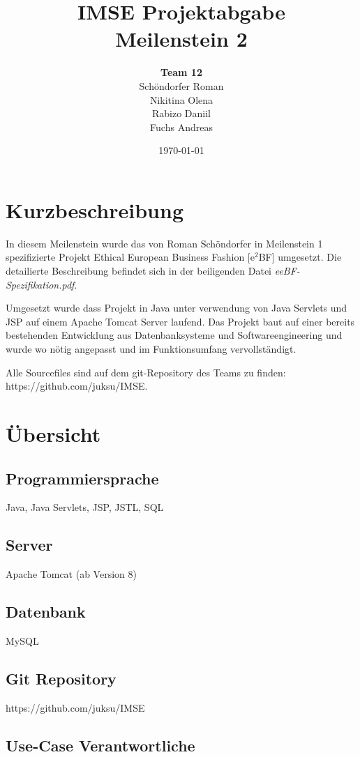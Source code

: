 \documentclass[a4paper]{article}
\title{\textbf{IMSE Projektabgabe}\\ Meilenstein 2}
\author{\textbf{Team 12} \\ Schöndorfer Roman \\ Nikitina Olena \\ Rabizo Daniil \\ Fuchs Andreas}
\date{\today}
\begin{document}
\maketitle


\section*{Kurzbeschreibung}
In diesem Meilenstein wurde das von Roman Schöndorfer in Meilenstein 1 spezifizierte Projekt Ethical European Business Fashion [e\(^2\)BF] umgesetzt. Die detailierte Beschreibung befindet sich in der beiligenden Datei \emph{eeBF-Spezifikation.pdf}.

Umgesetzt wurde dass Projekt in Java unter verwendung von Java Servlets und JSP auf einem Apache Tomcat Server laufend. Das Projekt baut auf einer bereits bestehenden Entwicklung aus Datenbanksysteme und Softwareengineering und wurde wo nötig angepasst und im Funktionsumfang vervollständigt.

Alle Sourcefiles sind auf dem git-Repository des Teams zu finden: \\ https://github.com/juksu/IMSE.

\section*{Übersicht}
\subsection*{Programmiersprache} Java, Java Servlets, JSP, JSTL, SQL

\subsection*{Server} Apache Tomcat (ab Version 8)

\subsection*{Datenbank} MySQL

\subsection*{Git Repository} https://github.com/juksu/IMSE

\subsection*{Use-Case Verantwortliche}
\end{document}
